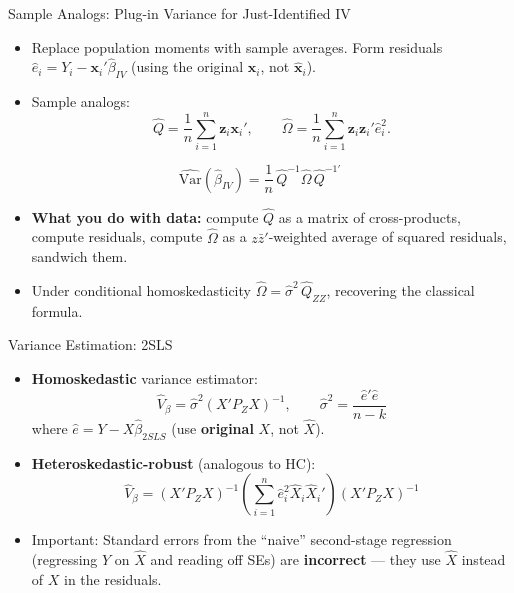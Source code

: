 \documentclass[aspectratio=169, handout]{beamer}
\numberwithin{equation}{section}
\begin{document}
\begin{frame}{Sample Analogs: Plug-in Variance for Just-Identified IV}
\begin{itemize}
\item Replace population moments with sample averages.  Form residuals $\hat{e}_i = Y_i - \bm{x}_i'\hat{\beta}_{IV}$ (using the original $\bm{x}_i$, not $\hat{\bm{x}}_i$).
\item Sample analogs:
$$\hat{Q}=\frac{1}{n}\sum_{i=1}^n \bm{z}_i\bm{x}_i', \qquad \hat{\Omega}=\frac{1}{n}\sum_{i=1}^n \bm{z}_i\bm{z}_i'\hat{e}_i^2.$$
\end{itemize}
\begin{tcolorbox}[colback=blue!5, colframe=blue!50]
$$\widehat{\text{Var}}(\hat{\beta}_{IV})=\frac{1}{n}\,\hat{Q}^{-1}\hat{\Omega}\,\hat{Q}^{-1\prime}$$
\end{tcolorbox}
\begin{itemize}
\item \textbf{What you do with data:} compute $\hat{Q}$ as a matrix of cross-products, compute residuals, compute $\hat{\Omega}$ as a $z\bar{z}'$-weighted average of squared residuals, sandwich them.
\item Under conditional homoskedasticity $\hat{\Omega}=\hat{\sigma}^2\,\hat{Q}_{ZZ}$, recovering the classical formula.
\end{itemize}
\end{frame}


\begin{frame}{Variance Estimation: 2SLS}
\begin{itemize}
\item \textbf{Homoskedastic} variance estimator:
$$\hat{V}_\beta = \hat{\sigma}^2(X'P_ZX)^{-1}, \qquad \hat{\sigma}^2 = \frac{\hat{e}'\hat{e}}{n-k}$$
where $\hat{e}=Y-X\hat{\beta}_{2SLS}$ (use \textbf{original} $X$, not $\hat{X}$).
\item \textbf{Heteroskedastic-robust} (analogous to HC):
$$\hat{V}_\beta = (X'P_ZX)^{-1}\left(\sum_{i=1}^n \hat{e}_i^2 \hat{X}_i\hat{X}_i'\right)(X'P_ZX)^{-1}$$
\item \alert{Important:} Standard errors from the ``naive'' second-stage regression (regressing $Y$ on $\hat{X}$ and reading off SEs) are \textbf{incorrect} --- they use $\hat{X}$ instead of $X$ in the residuals.
\end{itemize}
\end{frame}
\end{document}
